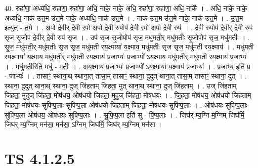 \documentclass[17pt]{extarticle}
\begin{document}
40. रुहा॑णा॒ अध्यधि॒ रुहा॑णा॒ रुहा॑णा॒ अधि॒ नाके॒ नाके॒ अधि॒ रुहा॑णा॒ रुहा॑णा॒ अधि॒ नाके᳚ । . अधि॒ नाके॒ नाके॒ अध्यधि॒ नाक॑ उत्त॒म उ॑त्त॒मे नाके॒ अध्यधि॒ नाक॑ उत्त॒मे । . नाक॑ उत्त॒म उ॑त्त॒मे नाके॒ नाक॑ उत्त॒मे । . उ॒त्त॒म इत्यु॑त् - त॒मे । . अ॒पो दे॒वीर् दे॒वी र॒पो अ॒पो दे॒वी रुपोप॑ दे॒वी र॒पो अ॒पो दे॒वी रुप॑ । . दे॒वी रुपोप॑ दे॒वीर् दे॒वी रुप॑ सृज सृ॒जोप॑ दे॒वीर् दे॒वी रुप॑ सृज । . उप॑ सृज सृ॒जोपोप॑ सृज॒ मधु॑मती॒र् मधु॑मतीः सृ॒जोपोप॑ सृज॒ मधु॑मतीः । . सृ॒ज॒ मधु॑मती॒र् मधु॑मतीः सृज सृज॒ मधु॑मती रय॒क्ष्माया॑ य॒क्ष्माय॒ मधु॑मतीः सृज सृज॒ मधु॑मती रय॒क्ष्माय॑ । . मधु॑मती रय॒क्ष्माया॑ य॒क्ष्माय॒ मधु॑मती॒र् मधु॑मती रय॒क्ष्माय॑ प्र॒जाभ्यः॑ 
प्र॒जाभ्यो॑ ऽय॒क्ष्माय॒ मधु॑मती॒र् मधु॑मती रय॒क्ष्माय॑ प्र॒जाभ्यः॑ । . मधु॑मती॒रिति॒ मधु॑ - म॒तीः॒ । . अ॒य॒क्ष्माय॑ प्र॒जाभ्यः॑ प्र॒जाभ्यो॑ ऽय॒क्ष्माया॑ य॒क्ष्माय॑ प्र॒जाभ्यः॑ । . प्र॒जाभ्य॒ इति॑ प्र - जाभ्यः॑ । . तासाꣳ॒॒ स्थाना॒थ् स्थाना॒त् तासा॒म् तासाꣳ॒॒ स्थाना॒ दुदुत् थाना॒त् तासा॒म् तासाꣳ॒॒ स्थाना॒ दुत् । . स्थाना॒ दुदुत् थाना॒थ् स्थाना॒ दुज् जि॑हताम् जिहता॒ मुत् थाना॒थ् स्थाना॒ दुज् जि॑हताम् । . उज् जि॑हताम् जिहता॒ मुदुज् जि॑हता॒ मोष॑धय॒ ओष॑धयो जिहता॒ मुदुज् जि॑हता॒ मोष॑धयः । . जि॒ह॒ता॒ मोष॑धय॒ ओष॑धयो जिहताम् जिहता॒ मोष॑धयः सुपिप्प॒लाः सु॑पिप्प॒ला ओष॑धयो जिहताम् जिहता॒ मोष॑धयः सुपिप्प॒लाः । . ओष॑धयः सुपिप्प॒लाः सु॑पिप्प॒ला ओष॑धय॒ ओष॑धयः सुपिप्प॒लाः । . सु॒पि॒प्प॒ला इति॑ सु - पि॒प्प॒लाः । . जिघ॑र् म्य॒ग्नि म॒ग्निम् जिघ॑र्मि॒ जिघ॑र् म्य॒ग्निम् मन॑सा॒ मन॑सा॒ ऽग्निम् जिघ॑र्मि॒ जिघ॑र् म्य॒ग्निम् मन॑सा । \newline
\pagebreak
{}

\section{ TS 4.1.2.5 }
\end{document}
